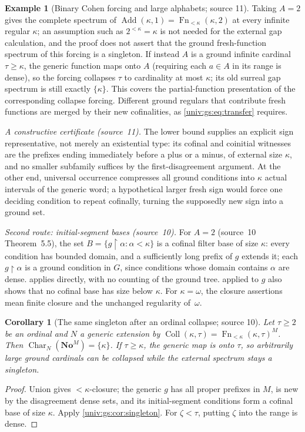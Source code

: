 \documentclass[11pt,letterpaper]{article}
\numberwithin{equation}{section}
\newtheorem{corollary}[corollary]{Corollary}
\theoremstyle{definition}
\newtheorem{example}[example]{Example}
\theoremstyle{remark}
\newcommand{\No}{\mathbf{No}}
\newcommand{\NoM}{\No^{M}}
\newcommand{\Add}{\operatorname{Add}}
\newcommand{\res}{\mathbin{\upharpoonright}}
\newcommand{\Char}{\operatorname{Char}}
\newcommand{\Fn}{\operatorname{Fn}}
\newcommand{\Coll}{\operatorname{Coll}}
\begin{document}
\begin{example}[Binary Cohen forcing and large alphabets; source 11]\label{univ:gs:ex:cohen}
Taking $A=2$ gives the complete spectrum of $\Add(\kappa,1)=\Fn_{<\kappa}(\kappa,2)$
at every infinite regular $\kappa$; an assumption such as $2^{<\kappa}=\kappa$ is not
needed for the external gap calculation, and the proof does not assert that the
ground fresh-function spectrum of this forcing is a singleton. If instead $A$ is a
ground infinite cardinal $\tau\ge\kappa$, the generic function maps onto $A$
(requiring each $a\in A$ in its range is dense), so the forcing collapses $\tau$ to
cardinality at most $\kappa$; its old surreal gap spectrum is still exactly
$\{\kappa\}$. This covers the partial-function presentation of the corresponding
collapse forcing. Different ground regulars that contribute fresh functions are
merged by their new cofinalities, as \eqref{univ:gs:eq:transfer} requires.
\end{example}

\emph{A constructive certificate (source~11).} The lower bound supplies an explicit
sign representative, not merely an existential type: its cofinal and coinitial
witnesses are the prefixes ending immediately before a plus or a minus, of external
size $\kappa$, and no smaller subfamily suffices by the first-disagreement argument.
At the other end, universal occurrence compresses all ground conditions into
$\kappa$ actual intervals of the generic word; a hypothetical larger fresh sign would
force one deciding condition to repeat cofinally, turning the supposedly new sign
into a ground set.

\emph{Second route: initial-segment bases (source~10).} For $A=2$ (source~10
Theorem~5.5), the set $B=\{g\res\alpha:\alpha<\kappa\}$ is a cofinal filter base of
size $\kappa$: every condition has bounded domain, and a sufficiently long prefix of
$g$ extends it; each $g\res\alpha$ is a ground condition in $G$, since conditions
whose domain contains $\alpha$ are dense.  applies
directly, with no counting of the ground tree.  applied
to $g$ also shows that no cofinal base has size below $\kappa$. For $\kappa=\omega$,
the closure assertions mean finite closure and the unchanged regularity of~$\omega$.

\begin{corollary}[The same singleton after an ordinal collapse; source 10]\label{univ:gs:cor:collapse}
Let $\tau\ge2$ be an ordinal and $N$ a generic extension by
$\Coll(\kappa,\tau)=\Fn_{<\kappa}(\kappa,\tau)^M$. Then $\Char_N(\NoM)=\{\kappa\}$. If
$\tau\ge\kappa$, the generic map is onto $\tau$, so arbitrarily large ground
cardinals can be collapsed while the external spectrum stays a singleton.
\end{corollary}
\begin{proof}
Union gives $<\kappa$-closure; the generic $g$ has all proper prefixes in $M$, is new
by the disagreement dense sets, and its initial-segment conditions form a cofinal
base of size $\kappa$. Apply \cref{univ:gs:cor:singleton}. For $\zeta<\tau$, putting
$\zeta$ into the range is dense.
\end{proof}
\end{document}
